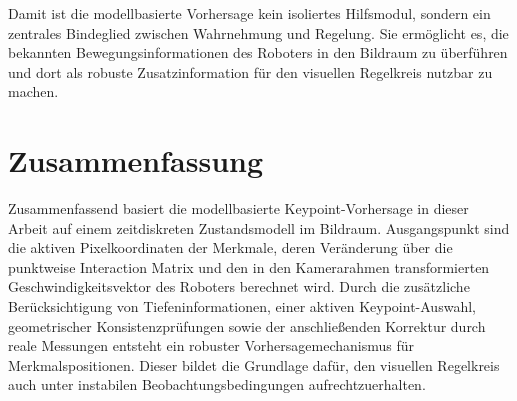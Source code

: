 Damit ist die modellbasierte Vorhersage kein isoliertes Hilfsmodul, sondern ein zentrales Bindeglied zwischen Wahrnehmung und Regelung. Sie ermöglicht es, die bekannten Bewegungsinformationen des Roboters in den Bildraum zu überführen und dort als robuste Zusatzinformation für den visuellen Regelkreis nutzbar zu machen.

\section{Zusammenfassung}
\label{sec:zusammenfassung_modellbasierte_vorhersage}

Zusammenfassend basiert die modellbasierte Keypoint-Vorhersage in dieser Arbeit auf einem zeitdiskreten Zustandsmodell im Bildraum. Ausgangspunkt sind die aktiven Pixelkoordinaten der Merkmale, deren Veränderung über die punktweise Interaction Matrix und den in den Kamerarahmen transformierten Geschwindigkeitsvektor des Roboters berechnet wird. Durch die zusätzliche Berücksichtigung von Tiefeninformationen, einer aktiven Keypoint-Auswahl, geometrischer Konsistenzprüfungen sowie der anschließenden Korrektur durch reale Messungen entsteht ein robuster Vorhersagemechanismus für Merkmalspositionen. Dieser bildet die Grundlage dafür, den visuellen Regelkreis auch unter instabilen Beobachtungsbedingungen aufrechtzuerhalten.
